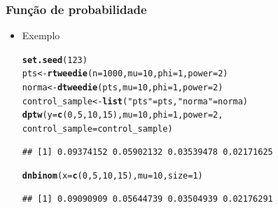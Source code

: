 \documentclass[10pt, aspectratio=169]{beamer}\usepackage[]{graphicx}\usepackage[]{color}
\makeatletter
\newcommand{\hlnum}[1]{\textcolor[rgb]{0.686,0.059,0.569}{#1}}%
\newcommand{\hlstr}[1]{\textcolor[rgb]{0.192,0.494,0.8}{#1}}%
\newcommand{\hlstd}[1]{\textcolor[rgb]{0.345,0.345,0.345}{#1}}%
\newcommand{\hlkwb}[1]{\textcolor[rgb]{0.69,0.353,0.396}{#1}}%
\newcommand{\hlkwc}[1]{\textcolor[rgb]{0.333,0.667,0.333}{#1}}%
\newcommand{\hlkwd}[1]{\textcolor[rgb]{0.737,0.353,0.396}{\textbf{#1}}}%
\newenvironment{kframe}{%
 \def\at@end@of@kframe{}%
 \ifinner\ifhmode%
  \def\at@end@of@kframe{\end{minipage}}%
  \begin{minipage}{\columnwidth}%
 \fi\fi%
 \def\FrameCommand##1{\hskip\@totalleftmargin \hskip-\fboxsep
 \colorbox{shadecolor}{##1}\hskip-\fboxsep
     \hskip-\linewidth \hskip-\@totalleftmargin \hskip\columnwidth}%
 \MakeFramed {\advance\hsize-\width
   \@totalleftmargin\z@ \linewidth\hsize
   \@setminipage}}%
 {\par\unskip\endMakeFramed%
 \at@end@of@kframe}
\newenvironment{knitrout}{}{} %
\makeatother
\begin{document}
\begin{frame}[fragile]
  \frametitle{Função de probabilidade}
  \begin{itemize}
  \item Exemplo

\begin{knitrout}
\color{fgcolor}\begin{kframe}
\begin{alltt}
\hlkwd{set.seed}\hlstd{(}\hlnum{123}\hlstd{)}
\hlstd{pts} \hlkwb{<-} \hlkwd{rtweedie}\hlstd{(}\hlkwc{n} \hlstd{=} \hlnum{1000}\hlstd{,} \hlkwc{mu} \hlstd{=} \hlnum{10}\hlstd{,} \hlkwc{phi} \hlstd{=} \hlnum{1}\hlstd{,} \hlkwc{power} \hlstd{=} \hlnum{2}\hlstd{)}
\hlstd{norma} \hlkwb{<-} \hlkwd{dtweedie}\hlstd{(pts,} \hlkwc{mu} \hlstd{=} \hlnum{10}\hlstd{,} \hlkwc{phi} \hlstd{=} \hlnum{1}\hlstd{,} \hlkwc{power} \hlstd{=} \hlnum{2}\hlstd{)}
\hlstd{control_sample} \hlkwb{<-} \hlkwd{list}\hlstd{(}\hlstr{"pts"} \hlstd{= pts,} \hlstr{"norma"} \hlstd{= norma)}
\hlkwd{dptw}\hlstd{(}\hlkwc{y} \hlstd{=} \hlkwd{c}\hlstd{(}\hlnum{0}\hlstd{,} \hlnum{5}\hlstd{,} \hlnum{10}\hlstd{,} \hlnum{15}\hlstd{),} \hlkwc{mu} \hlstd{=} \hlnum{10}\hlstd{,} \hlkwc{phi} \hlstd{=} \hlnum{1}\hlstd{,} \hlkwc{power} \hlstd{=} \hlnum{2}\hlstd{,}
     \hlkwc{control_sample} \hlstd{= control_sample)}
\end{alltt}
\begin{verbatim}
## [1] 0.09374152 0.05902132 0.03539478 0.02171625
\end{verbatim}
\begin{alltt}
\hlkwd{dnbinom}\hlstd{(}\hlkwc{x} \hlstd{=} \hlkwd{c}\hlstd{(}\hlnum{0}\hlstd{,} \hlnum{5}\hlstd{,} \hlnum{10}\hlstd{,} \hlnum{15}\hlstd{),} \hlkwc{mu} \hlstd{=} \hlnum{10}\hlstd{,} \hlkwc{size} \hlstd{=} \hlnum{1}\hlstd{)}
\end{alltt}
\begin{verbatim}
## [1] 0.09090909 0.05644739 0.03504939 0.02176291
\end{verbatim}
\end{kframe}
\end{knitrout}

\end{itemize}
\end{frame}
\end{document}
